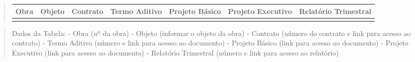 \documentclass[]{book}
\begin{document}
\begin{quote}
\begin{longtable}[]{@{}lllllll@{}}
\toprule
\begin{minipage}[b]{0.08\columnwidth}\raggedright
Obra\strut
\end{minipage} & \begin{minipage}[b]{0.10\columnwidth}\raggedright
Objeto\strut
\end{minipage} & \begin{minipage}[b]{0.08\columnwidth}\raggedright
Contrato\strut
\end{minipage} & \begin{minipage}[b]{0.13\columnwidth}\raggedright
Termo Aditivo\strut
\end{minipage} & \begin{minipage}[b]{0.11\columnwidth}\raggedright
Projeto Básico\strut
\end{minipage} & \begin{minipage}[b]{0.14\columnwidth}\raggedright
Projeto Executivo\strut
\end{minipage} & \begin{minipage}[b]{0.17\columnwidth}\raggedright
Relatório Trimestral\strut
\end{minipage}\tabularnewline
\midrule
\endhead
\begin{minipage}[t]{0.08\columnwidth}\raggedright
\strut
\end{minipage} & \begin{minipage}[t]{0.10\columnwidth}\raggedright
\strut
\end{minipage} & \begin{minipage}[t]{0.08\columnwidth}\raggedright
\strut
\end{minipage} & \begin{minipage}[t]{0.13\columnwidth}\raggedright
\strut
\end{minipage} & \begin{minipage}[t]{0.11\columnwidth}\raggedright
\strut
\end{minipage} & \begin{minipage}[t]{0.14\columnwidth}\raggedright
\strut
\end{minipage} & \begin{minipage}[t]{0.17\columnwidth}\raggedright
\strut
\end{minipage}\tabularnewline
\bottomrule
\end{longtable}
\end{quote}

\begin{quote}
Dados da Tabela:
- Obra (nº da obra)
- Objeto (informar o objeto da obra)
- Contrato (número do contrato e link para acesso ao contrato)
- Termo Aditivo (número e link para acesso ao documento)
- Projeto Básico (link para acesso ao documento)
- Projeto Executivo (link para acesso ao documento)
- Relatório Trimestral (número e link para acesso ao relatório)
\end{quote}
\end{document}
